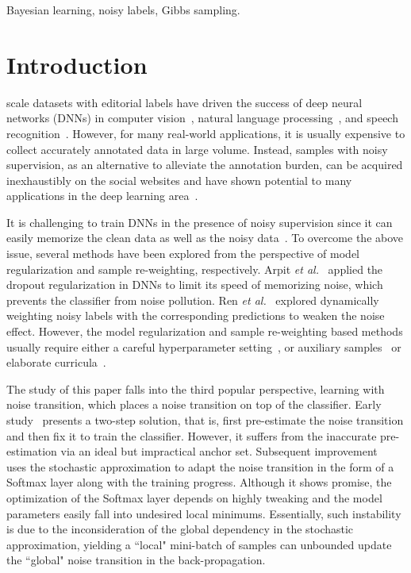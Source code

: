 \documentclass[journal]{IEEEtran}
\begin{document}
\begin{IEEEkeywords}
Bayesian learning, noisy labels, Gibbs sampling.
\end{IEEEkeywords}


\IEEEpeerreviewmaketitle



\section{Introduction}
 scale datasets with editorial labels have driven the success of deep neural networks (DNNs) in computer vision~\cite{NIPS2012_4824}, natural language processing~\cite{sutskever2014sequence}, and speech recognition~\cite{hinton2012deep}. However, for many real-world applications, it is usually expensive to collect accurately annotated data in large volume. Instead, samples with noisy supervision, as an alternative to alleviate the annotation burden, can be acquired inexhaustibly on the social websites and have shown potential to many applications in the deep learning area~\cite{7953515,8293849,8410611,yao2017deep}. 

It is challenging to train DNNs in the presence of noisy supervision since it can easily memorize the clean data as well as the noisy data~\cite{arpit2017closer}. To overcome the above issue, several methods have been explored from the perspective of model regularization and sample re-weighting, respectively. Arpit \textit{et al.}~\cite{arpit2017closer} applied the dropout regularization in DNNs to limit its speed of memorizing noise, which prevents the classifier from  noise pollution. Ren \textit{et al.}~\cite{pmlr-v80-ma18d} explored dynamically weighting noisy labels with the corresponding predictions to weaken the noise effect. However, the model regularization and sample re-weighting based methods usually require either a careful hyperparameter setting~\cite{arpit2017closer}, or auxiliary samples~\cite{pmlr-v80-ren18a} or elaborate curricula~\cite{Guo_2018_ECCV}. 

The study of this paper falls into the third popular perspective, learning with noise transition, which places a noise transition on top of the classifier. Early study~\cite{patrini2017making} presents a two-step solution, that is, first pre-estimate the noise transition and then fix it to train the classifier. However, it suffers from the inaccurate pre-estimation via an ideal but impractical anchor set. Subsequent improvement~\cite{goldberger2016training} uses the stochastic approximation to adapt the noise transition in the form of a Softmax layer along with the training progress. Although it shows promise, the optimization of the Softmax layer depends on highly tweaking and the model parameters easily fall into undesired local minimums. Essentially, such instability is due to the inconsideration of the global dependency in the stochastic approximation, yielding a ``local" mini-batch of samples can unbounded update the ``global" noise transition in the back-propagation. 
\end{document}
